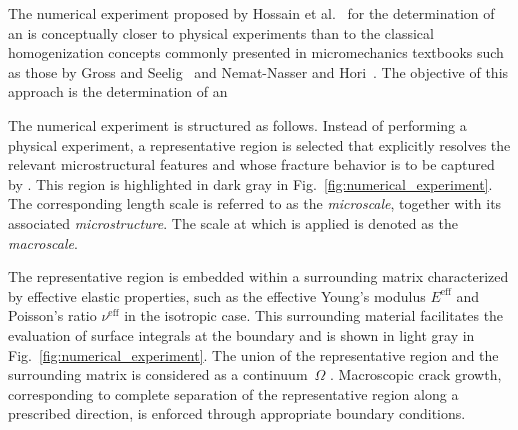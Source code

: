 \documentclass[pdflatex,sn-mathphys-num]{sn-jnl}%
\theoremstyle{thmstyleone}%
\theoremstyle{thmstyletwo}%
\theoremstyle{thmstylethree}%
\begin{document}
The numerical experiment proposed by Hossain et al.~\cite{hossain_effective_2014} for the determination of an  is conceptually closer to physical experiments than to the classical homogenization concepts commonly presented in micromechanics textbooks such as those by Gross and Seelig~\cite{gross_fracture_2011} and Nemat-Nasser and Hori~\cite{nemat-nasser_micromechanics_2013}. 
The objective of this approach is the determination of an 

The numerical experiment is structured as follows.
Instead of performing a physical experiment, a representative region
 is selected that explicitly resolves the relevant microstructural features and whose fracture behavior is to be captured by .
This region is highlighted in dark gray in Fig.~\ref{fig:numerical_experiment}.
The corresponding length scale is referred to as the \textsl{microscale}, together with its associated \textsl{microstructure}.
The scale at which  is applied is denoted as the \textsl{macroscale}.

The representative  region  is embedded within a surrounding matrix characterized by effective elastic properties, 
such as the effective Young's modulus $E^{\text{eff}}$ and Poisson's ratio $\nu^{\text{eff}}$ in the isotropic case.
This surrounding material facilitates the evaluation of surface integrals at the boundary and is shown in light gray in Fig.~\ref{fig:numerical_experiment}.
The union of the representative region and the surrounding matrix is considered as a continuum~$\Omega$ . 
Macroscopic crack growth, corresponding to complete separation of the representative region along a prescribed direction, is enforced through appropriate boundary conditions.
\end{document}
